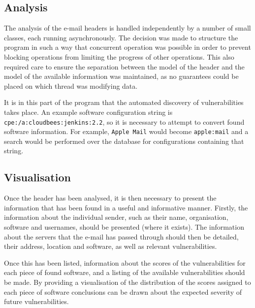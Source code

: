 \subsection{Analysis}

The analysis of the e-mail headers is handled independently by a number of
small classes, each running asynchronously.  The decision was made to structure
the program in such a way that concurrent operation was possible in order to
prevent blocking operations from limiting the progress of other operations.
This also required care to ensure the separation between the model of the
header and the model of the available information was maintained, as no
guarantees could be placed on which thread was modifying data.

It is in this part of the program that the automated discovery of
vulnerabilities takes place.  An example software configuration string is
\texttt{cpe:/a:cloudbees:jenkins:2.2}, so it is necessary to attempt to convert
found software information.  For example, \texttt{Apple Mail} would become
\texttt{apple:mail} and a search would be performed over the database for
configurations containing that string.


\subsection{Visualisation}

Once the header has been analysed, it is then necessary to present the
information that has been found in a useful and informative manner. Firstly,
the information about the individual sender, such as their name, organisation,
software and usernames, should be presented (where it exists).  The information
about the servers that the e-mail has passed through should then be detailed, 
their address, location and software, as well as relevant vulnerabilities.

Once this has been listed, information about the scores of the vulnerabilities
for each piece of found software, and a listing of the available
vulnerabilities should be made.  By providing a visualisation of the
distribution of the scores assigned to each piece of software conclusions can 
be drawn about the expected severity of future vulnerabilities.
